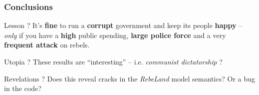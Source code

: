 \documentclass{beamer}
\begin{document}
\begin{frame}
	\frametitle{Conclusions}
	\begin{block}{Lesson ?}
		It's \textbf{fine} to run a \textbf{corrupt} government and keep its people \textbf{happy} -- \emph{only} if you have a \textbf{high} public spending, \textbf{large police force} and a very \textbf{frequent attack} on rebels.
	\end{block}
	\begin{block}{Utopia ?}
		These results are ``interesting'' -- i.e. \textit{communist dictatorship} ?
	\end{block}
	\begin{block}{Revelations ?}
		Does this reveal cracks in the \emph{RebeLand} model semantics? Or a bug in the code?
	\end{block}
\end{frame}

\end{document}
